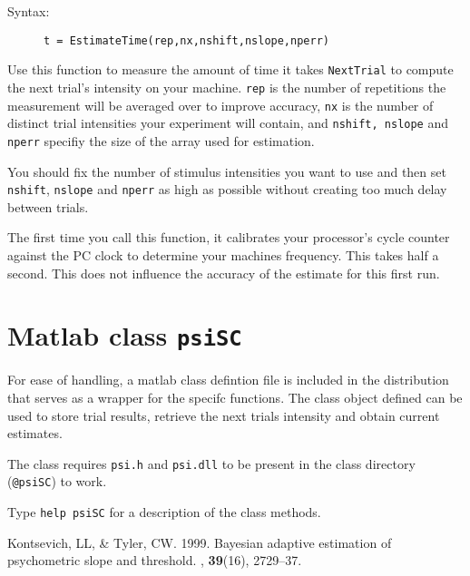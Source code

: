 \documentclass[10pt,letterpaper]{article}
\begin{document}
\begin{description}
\item[Syntax:] {\tt t = EstimateTime(rep,nx,nshift,nslope,nperr)}
\end{description}

Use this function to measure the amount of time it takes {\tt NextTrial} to 
compute the next trial's intensity on your machine. {\tt rep} is the number of 
repetitions the measurement will be averaged over to improve accuracy, {\tt nx} 
is the number of distinct trial intensities your experiment will contain, and 
{\tt nshift, nslope} and {\tt nperr} specifiy the size of the array used for estimation.

You should fix the number of stimulus intensities you want to use and then set 
{\tt nshift}, {\tt nslope} and {\tt nperr} as high as possible without creating 
too much delay between trials.

The first time you call this function, it calibrates your processor's cycle 
counter against the PC clock to determine your machines frequency. This takes 
half a second. This does not influence the accuracy of the estimate for this 
first run.

\section{Matlab class {\tt psiSC}}

For ease of handling, a matlab class defintion file is included in the distribution
that serves as a wrapper for the specifc functions. The class object defined can be used to
store trial results, retrieve the next trials intensity and obtain current estimates.

The class requires {\tt psi.h} and {\tt psi.dll} to be present in the class directory 
({\tt @psiSC}) to work.

Type {\tt help psiSC} for a description of the class methods.

\begin{thebibliography}{}

{\sc Kontsevich, LL, \& Tyler, CW}. 1999.
\newblock Bayesian adaptive estimation of psychometric slope and threshold.
, {\bf 39}(16), 2729--37.

\end{thebibliography}
\end{document}
